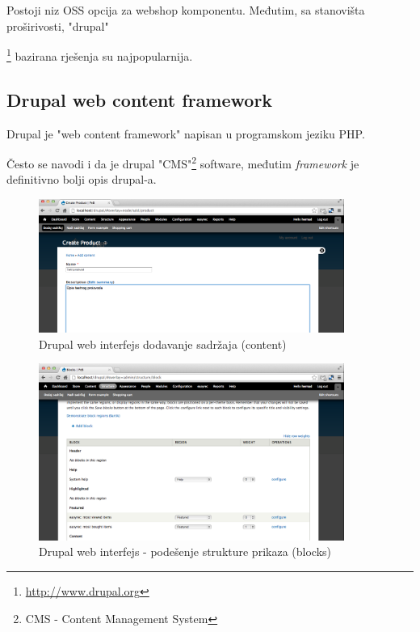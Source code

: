 \documentclass[times, utf8, seminar]{fit}
\begin{document}
Postoji niz OSS opcija za webshop komponentu. Međutim, sa stanovišta proširivosti, "drupal"{\footnote{\url{http://www.drupal.org}} bazirana rješenja su najpopularnija.

\subsection{Drupal web content framework}

Drupal je "web content framework" napisan u programskom jeziku PHP. 

Često se navodi i da je drupal "CMS"{\footnote{CMS - Content Management System}} software, međutim \emph{framework} je 
definitivno bolji opis drupal-a.

\begin{figure}[H]
\centering
\includegraphics[width=10cm]{img/drupal_add_content.png}\hfill
\caption{Drupal web interfejs dodavanje sadržaja (content)}
\end{figure}

\begin{figure}[H]
\centering
\includegraphics[width=10cm]{img/drupal_block_structure.png}\hfill
\caption{Drupal web interfejs - podešenje strukture prikaza (blocks)}
\end{figure}



}
\end{document}
